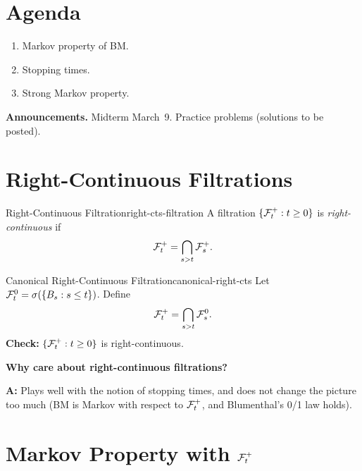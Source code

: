 
\section*{Agenda}
\begin{enumerate}
    \item Markov property of BM.
    \item Stopping times.
    \item Strong Markov property.
\end{enumerate}

\noindent\textbf{Announcements.} Midterm March~9. Practice problems (solutions to be posted).

\section{Right-Continuous Filtrations}

\begin{definition}{Right-Continuous Filtration}{right-cts-filtration}
    A filtration $\{\mathcal{F}_t^+ : t \geq 0\}$ is \emph{right-continuous} if
    \[
        \mathcal{F}_t^+ = \bigcap_{s > t} \mathcal{F}_s^+.
    \]
\end{definition}

\begin{example}{Canonical Right-Continuous Filtration}{canonical-right-cts}
    Let $\mathcal{F}_t^0 = \sigma(\{B_s : s \leq t\})$. Define
    \[
        \mathcal{F}_t^+ = \bigcap_{s > t} \mathcal{F}_s^0.
    \]
    \textbf{Check:} $\{\mathcal{F}_t^+ : t \geq 0\}$ is right-continuous.
\end{example}

\textbf{Why care about right-continuous filtrations?}

\noindent\textbf{A:} Plays well with the notion of stopping times, and does not change the picture too much (BM is Markov with respect to $\mathcal{F}_t^+$, and Blumenthal's 0/1 law holds).

\section{Markov Property with $\mathcal{F}_t^+$}


